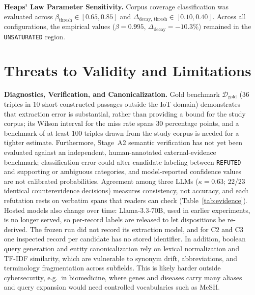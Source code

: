 \documentclass[runningheads]{llncs}
\begin{document}
\noindent\textbf{Heaps' Law Parameter Sensitivity.} Corpus coverage classification was evaluated across $\beta_{\text{thresh}} \in [0.65, 0.85]$ and $\Delta_{\text{decay, thresh}} \in [0.10, 0.40]$. Across all configurations, the empirical values ($\beta = 0.995$, $\Delta_{\text{decay}} = -10.3\%$) remained in the \texttt{UNSATURATED} region.

\section{Threats to Validity and Limitations}
\label{sec:threats}

\noindent\textbf{Diagnostics, Verification, and Canonicalization.} Gold benchmark $\mathcal{D}_{\text{gold}}$ (36 triples in 10 short constructed passages outside the IoT domain) demonstrates that extraction error is substantial, rather than providing a bound for the study corpus; its Wilson interval for the miss rate spans 30 percentage points, and a benchmark of at least 100 triples drawn from the study corpus is needed for a tighter estimate. Furthermore, Stage~A2 semantic verification has not yet been evaluated against an independent, human-annotated external-evidence benchmark; classification error could alter candidate labeling between \texttt{REFUTED} and supporting or ambiguous categories, and model-reported confidence values are not calibrated probabilities. Agreement among three LLMs ($\kappa = 0.63$; 22/23 identical counterevidence decisions) measures consistency, not accuracy, and each refutation rests on verbatim spans that readers can check (Table~\ref{tab:evidence}). Hosted models also change over time: Llama-3.3-70B, used in earlier experiments, is no longer served, so per-record labels are released to let dispositions be re-derived. The frozen run did not record its extraction model, and for C2 and C3 one inspected record per candidate has no stored identifier. In addition, boolean query generation and entity canonicalization rely on lexical normalization and TF-IDF similarity, which are vulnerable to synonym drift, abbreviations, and terminology fragmentation across subfields. This is likely harder outside cybersecurity, e.g.\ in biomedicine, where genes and diseases carry many aliases and query expansion would need controlled vocabularies such as MeSH.
\end{document}
